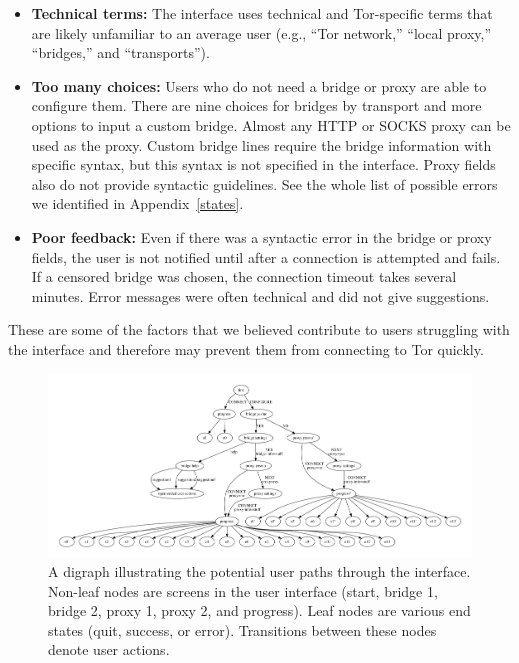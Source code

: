 \documentclass[USenglish,oneside,twocolumn]{article}
\begin{document}
\begin{itemize}
\item {\bfseries Technical terms:} The interface uses technical and Tor-specific terms that are likely unfamiliar to an average user (e.g., ``Tor network,'' ``local proxy,'' ``bridges,'' and ``transports''). 
\item {\bfseries Too many choices:}  Users who do not need a bridge or proxy are able to configure them. There are nine choices for bridges by transport and more options to input a custom bridge. Almost any HTTP or SOCKS proxy can be used as the proxy. Custom bridge lines require the bridge information with specific syntax, but this syntax is not specified in the interface. Proxy fields also do not provide syntactic guidelines. See the whole list of possible errors we identified in Appendix~\ref{states}. 
\item {\bfseries Poor feedback:} Even if there was a syntactic error in the bridge or proxy fields, the user is not notified until after a connection is attempted and fails. If a censored bridge was chosen, the connection timeout takes several minutes. Error messages were often technical and did not give suggestions.
\end{itemize}

These are some of the factors that we believed contribute to users struggling with the interface and therefore may prevent them from connecting to Tor quickly.


\begin{figure}
\centering
\includegraphics[width=\textwidth]{torconfig.pdf}
\caption{
A digraph illustrating the potential user paths through the interface. Non-leaf nodes are screens in the user interface (start, bridge 1, bridge 2, proxy 1, proxy 2, and progress). Leaf nodes are various end states (quit, success, or error). Transitions between these nodes denote user actions. 
}
\label{fig:digraph}
\end{figure} 
\end{document}
